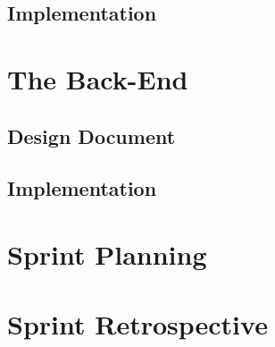 \documentclass[12pt,onecolumn]{article}
\begin{document}
	\subsection{Implementation} %

\section{The Back-End}

	\subsection{Design Document} %

	\subsection{Implementation} %

\section{Sprint Planning} %

\section{Sprint Retrospective} %
\end{document}
